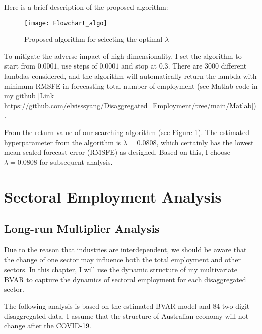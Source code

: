 \documentclass{monashthesis}
\begin{document}
Here is a brief description of the proposed algorithm:

\graphicspath{ {/Users/elvisyang/Desktop/hon_proj/Disaggregated_Employment/Honours_thesis/figures} }

\begin{figure}[ht]
\texttt{[image: Flowchart\_algo]}
\centering
\caption{Proposed algorithm for selecting the optimal $\lambda$}
\label{fig:sealgo}
\end{figure}

To mitigate the adverse impact of high-dimensionality, I set the algorithm to start from \(0.0001\), use steps of \(0.0001\) and stop at \(0.3\). There are 3000 different lambdas considered, and the algorithm will automatically return the lambda with minimum RMSFE in forecasting total number of employment (see Matlab code in my github {[}Link \url{https://github.com/elvisssyang/Disaggregated_Employment/tree/main/Matlab}{]}).

From the return value of our searching algorithm (see Figure \ref{fig:sealgo}). The estimated hyperparameter from the algorithm is \(\lambda=0.0808\), which certainly has the lowest mean scaled forecast error (RMSFE) as designed. Based on this, I choose \(\lambda=0.0808\) for subsequent analysis.

\newpage

\hypertarget{sectoral-employment-analysis}{%
\chapter{Sectoral Employment Analysis}\label{sectoral-employment-analysis}}

\hypertarget{long-run-multiplier-analysis}{%
\section{Long-run Multiplier Analysis}\label{long-run-multiplier-analysis}}

Due to the reason that industries are interdependent, we should be aware that the change of one sector may influence both the total employment and other sectors. In this chapter, I will use the dynamic structure of my multivariate BVAR to capture the dynamics of sectoral employment for each disaggregated sector.

The following analysis is based on the estimated BVAR model and 84 two-digit disaggregated data. I assume that the structure of Australian economy will not change after the COVID-19.
\end{document}
